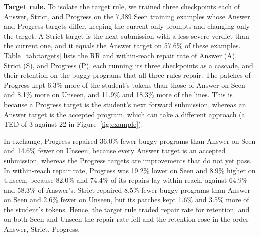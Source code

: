 \documentclass[conference]{IEEEtran}
\begin{document}
\noindent\textbf{Target rule.} To isolate the target rule, we trained three checkpoints each of Answer, Strict, and Progress on the 7,389 Seen training examples whose Answer and Progress targets differ, keeping the current-only prompts and changing only the target. A Strict target is the next submission with a less severe verdict than the current one, and it equals the Answer target on 57.6\% of these examples. Table~\ref{tab:targets} lists the RR and within-reach repair rate of Answer (A), Strict (S), and Progress (P), each running its three checkpoints as a cascade, and their retention on the buggy programs that all three rules repair. The patches of Progress kept 6.3\% more of the student's tokens than those of Answer on Seen and 8.1\% more on Unseen, and 11.9\% and 18.3\% more of the lines. This is because a Progress target is the student's next forward submission, whereas an Answer target is the accepted program, which can take a different approach (a TED of 3 against 22 in Figure~\ref{fig:example}).

In exchange, Progress repaired 36.0\% fewer buggy programs than Answer on Seen and 14.6\% fewer on Unseen, because every Answer target is an accepted submission, whereas the Progress targets are improvements that do not yet pass. In within-reach repair rate, Progress was 19.2\% lower on Seen and 8.9\% higher on Unseen, because 82.0\% and 74.4\% of its repairs lay within reach, against 64.9\% and 58.3\% of Answer's. Strict repaired 8.5\% fewer buggy programs than Answer on Seen and 2.6\% fewer on Unseen, but its patches kept 1.6\% and 3.5\% more of the student's tokens. Hence, the target rule traded repair rate for retention, and on both Seen and Unseen the repair rate fell and the retention rose in the order Answer, Strict, Progress.
\end{document}
